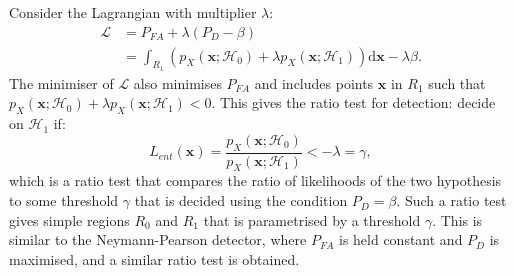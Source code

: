 \documentclass[11pt]{article}
\newcommand{\bx}{\mathbf{x}}
\newcommand{\cH}{\mathcal{H}}
\newcommand{\dd}{\mathrm{d}}
\begin{document}
Consider the Lagrangian with multiplier $\lambda$:
\begin{equation}
\begin{split}
	\mathcal{L} &= P_{FA} + \lambda (P_{D}-\beta) \\
	&= \int_{R_{1}} \left( p_{X}(\bx;\cH_{0}) + \lambda p_{X}(\bx;\cH_{1}) \right) \dd\bx - \lambda\beta.
\end{split}
\label{eq:CDRLag}
\end{equation}
The minimiser of $\mathcal{L}$ also minimises $P_{FA}$ and includes points $\bx$ in $R_{1}$ such that $p_{X}(\bx;\cH_{0}) + \lambda p_{X}(\bx;\cH_{1}) < 0$. This gives the ratio test for detection: decide on $\cH_{1}$ if:
\begin{equation}
	L_{ent}(\bx) = \frac{p_{X}(\bx;\cH_{0})}{p_{X}(\bx;\cH_{1})} < -\lambda = \gamma,
\label{eq:CDRratioTest}
\end{equation}
which is a ratio test that compares the ratio of likelihoods of the two hypothesis to some threshold $\gamma$ that is decided using the condition $P_{D}=\beta$. Such a ratio test gives simple regions $R_{0}$ and $R_{1}$ that is parametrised by a threshold $\gamma$. This is similar to the Neymann-Pearson detector, where $P_{FA}$ is held constant and $P_{D}$ is maximised, and a similar ratio test is obtained.
\end{document}
